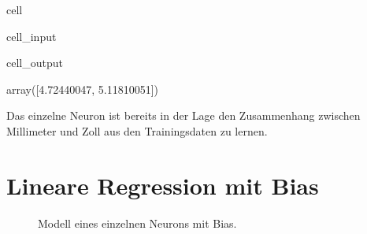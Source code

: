\documentclass[letterpaper,10pt,english]{jupyterBook}
\let\sphinxpxdimen\pdfpxdimen\else\newdimen\sphinxpxdimen
\begin{document}
\begin{sphinxuseclass}{cell}\begin{sphinxVerbatimInput}

\begin{sphinxuseclass}{cell_input}
\begin{sphinxVerbatim}[commandchars=\\\{\}]
\PYG{p}{[}
    \PYG{p}{[}\PYG{p}{]}
    \PYG{p}{[}\PYG{p}{]}
\PYG{p}{]}
\end{sphinxVerbatim}

\end{sphinxuseclass}\end{sphinxVerbatimInput}
\begin{sphinxVerbatimOutput}

\begin{sphinxuseclass}{cell_output}
\begin{sphinxVerbatim}[commandchars=\\\{\}]
array([4.72440047, 5.11810051])
\end{sphinxVerbatim}

\end{sphinxuseclass}\end{sphinxVerbatimOutput}

\end{sphinxuseclass}
\sphinxAtStartPar
Das einzelne Neuron ist bereits in der Lage den Zusammenhang zwischen Millimeter und Zoll aus den Trainingsdaten zu lernen.


\chapter{Lineare Regression mit Bias}
\label{\detokenize{02_NN/einzelnes_neuron:lineare-regression-mit-bias}}
\sphinxAtStartPar
{}

\begin{figure}[htbp]
\centering
\capstart

\noindent\sphinxincludegraphics[width=900\sphinxpxdimen]{{neuron_bias}.png}
\caption{Modell eines einzelnen Neurons mit Bias.}\label{\detokenize{02_NN/einzelnes_neuron:id2}}\end{figure}
\end{document}
